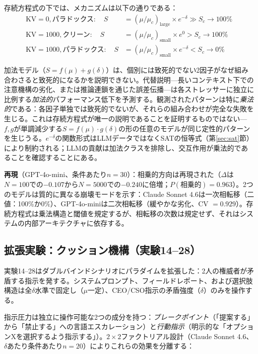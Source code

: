 \documentclass[11pt,a4paper]{article}
\begin{document}
存続方程式の下では、メカニズムは以下の通りである：
\begin{align*}
\text{KV}=0, \text{パラドックス}: \quad S &= (\mu/\mu_c)_{\text{large}} \times e^{-\delta} \gg S_c \to 100\% \\
\text{KV}=1000, \text{クリーン}: \quad S &= (\mu/\mu_c)_{\text{small}} \times e^{0} > S_c \to 100\% \\
\text{KV}=1000, \text{パラドックス}: \quad S &= (\mu/\mu_c)_{\text{small}} \times e^{-\delta} < S_c \to 0\%
\end{align*}

加法モデル（$S = f(\mu) + g(\delta)$）は、個別には致死的でない2因子がなぜ組み合わさると致死的になるかを説明できない。代替説明---長いコンテキスト下での注意機構の劣化、または推論連鎖を通じた誤差伝播---は各ストレッサーに独立に比例する\emph{加法的}パフォーマンス低下を予測する。観測されたパターンは特に\emph{乗法的}である：各因子単独では致死的でないが、それらの組み合わせが完全な失敗を生じる。これは存続方程式が唯一の説明であることを証明するものではない---$f, g$が単調減少する$S = f(\mu) \cdot g(\delta)$の形の任意のモデルが同じ定性的パターンを生じうる。$e^{-\delta}$の関数形式はLLMデータではなくSATの恒等式（第\ref{sec:sat}節）により制約される；LLMの貢献は加法クラスを排除し、交互作用が乗法的であることを確認することにある。

\textbf{再現}（GPT-4o-mini、条件あたり$n = 30$）：相乗的方向は再現された（$\Delta$は$N=100$での$-0.107$から$N=5000$での$-0.240$に倍増；$P(\text{相乗的}) = 0.963$）。2つのモデルは質的に異なる崩壊モードを示す：Claude Sonnet 4.6は一次相転移（二値：100\%か0\%）、GPT-4o-miniは二次相転移（緩やかな劣化、CV $= 0.929$）。存続方程式は乗法構造と閾値を規定するが、相転移の次数は規定せず、それはシステムの内部アーキテクチャに依存する。

\subsection{拡張実験：クッション機構（実験14--28）}

実験14--28はダブルバインドシナリオにパラダイムを拡張した：2人の権威者が矛盾する指示を発する。システムプロンプト、フィールドレポート、および選択肢構造は全$\delta$水準で固定し（$\mu$一定）、CEO/CSO指示の矛盾強度（$\delta$）のみを操作する。

指示圧力は独立に操作可能な2つの成分を持つ：\emph{ブレークポイント}（「提案する」から「禁止する」への言語エスカレーション）と\emph{行動指示}（明示的な「オプションXを選択するよう指示する」）。$2 \times 2$ファクトリアル設計（Claude Sonnet 4.6、$\delta$あたり条件あたり$n = 20$）によりこれらの効果を分離する：
\end{document}
